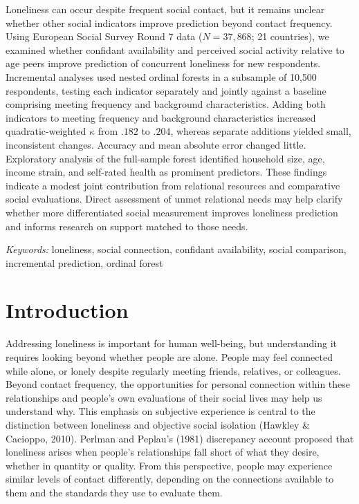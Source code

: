 \documentclass[12pt]{article}
\begin{document}
Loneliness can occur despite frequent social contact, but it remains unclear whether other
social indicators improve prediction beyond contact frequency. Using European Social
Survey Round 7 data ($N = 37{,}868$; 21 countries), we examined whether confidant
availability and perceived social activity relative to age peers improve prediction of
concurrent loneliness for new respondents. Incremental analyses used nested ordinal
forests in a subsample of 10,500 respondents, testing each indicator separately and
jointly against a baseline comprising meeting frequency and background characteristics.
Adding both indicators to meeting frequency and background characteristics increased
quadratic-weighted $\kappa$ from $.182$ to $.204$, whereas separate additions yielded
small, inconsistent changes. Accuracy and mean absolute error changed little. Exploratory
analysis of the full-sample forest identified household size, age, income strain, and
self-rated health as prominent predictors. These findings indicate a modest joint
contribution from relational resources and comparative social evaluations. Direct
assessment of unmet relational needs may help clarify whether more differentiated social
measurement improves loneliness prediction and informs research on support matched to
those needs.

\textit{Keywords:} loneliness, social connection, confidant availability, social
comparison, incremental prediction, ordinal forest

\newpage


\section{Introduction}

Addressing loneliness is important for human well-being, but understanding it requires
looking beyond whether people are alone. People may feel connected while alone, or lonely
despite regularly meeting friends, relatives, or colleagues. Beyond contact frequency, the
opportunities for personal connection within these relationships and people's own
evaluations of their social lives may help us understand why. This emphasis on subjective
experience is central to the distinction between loneliness and objective social isolation
(Hawkley \& Cacioppo, 2010). Perlman and Peplau's (1981) discrepancy account proposed that
loneliness arises when people's relationships fall short of what they desire, whether in
quantity or quality. From this perspective, people may experience similar levels of
contact differently, depending on the connections available to them and the standards they
use to evaluate them.
\end{document}
